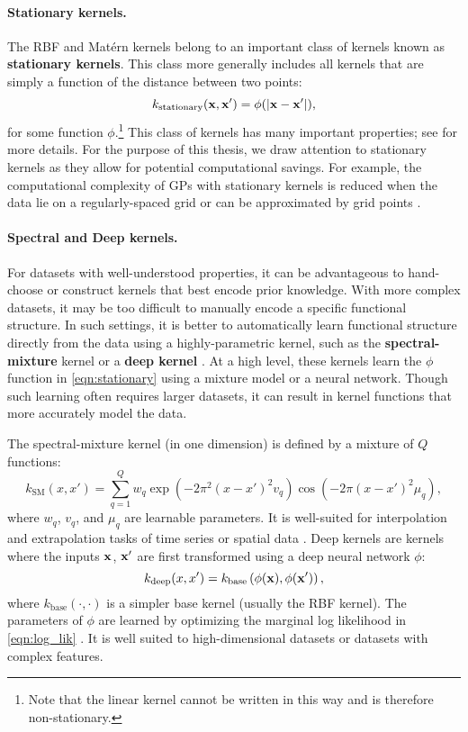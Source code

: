 \paragraph{Stationary kernels.}
The RBF and Mat\'ern kernels belong to an important class of kernels known as {\bf stationary kernels}.
This class more generally includes all kernels that are simply a function of the distance between two points:
\begin{equation}
  k_\text{stationary} (\mathbf{x}, \mathbf{x}') = \phi( \vert \mathbf{x} - \mathbf{x}' \vert ),
  \label{eqn:stationary}
\end{equation}
for some function $\phi$.\footnote{
  Note that the linear kernel cannot be written in this way and is therefore non-stationary.
}
This class of kernels has many important properties; see \citep[e.g.][]{rasmussen2006gaussian,wilson2013gaussian} for more details.
For the purpose of this thesis, we draw attention to stationary kernels as they allow for potential computational savings.
For example, the computational complexity of GPs with stationary kernels is reduced when the data lie on a regularly-spaced grid \cite{cunningham2008fast,saatcci2012scalable} or can be approximated by grid points \cite{wilson2014thesis,wilson2015kernel}.


\paragraph{Spectral and Deep kernels.}
For datasets with well-understood properties, it can be advantageous to hand-choose or construct kernels that best encode prior knowledge.
With more complex datasets, it may be too difficult to manually encode a specific functional structure.
In such settings, it is better to automatically learn functional structure directly from the data using a highly-parametric kernel, such as the {\bf spectral-mixture} kernel \cite{wilson2013gaussian} or a {\bf deep kernel} \cite{wilson2016deep}.
At a high level, these kernels learn the $\phi$ function in \cref{eqn:stationary} using a mixture model or a neural network.
Though such learning often requires larger datasets, it can result in kernel functions that more accurately model the data.

The spectral-mixture kernel (in one dimension) is defined by a mixture of $Q$ functions:
%
\[
  k_\text{SM} (x, x') = \sum_{q=1}^Q w_q
    \exp \left( -2 \pi^2 (x - x')^2 v_q \right)
    \cos \left( -2 \pi (x - x')^2 \mu_q \right),
\]
%
where $w_q$, $v_q$, and $\mu_q$ are learnable parameters.
It is well-suited for interpolation and extrapolation tasks of time series or spatial data \cite{wilson2013gaussian}.
Deep kernels \cite{wilson2016deep}  are kernels where the inputs $\mathbf{x}$, $\mathbf{x}'$ are first transformed using a deep neural network $\phi$:
%
\[
  k_\text{deep} (x, x') = k_\text{base} \left( \phi(\mathbf{x}), \phi(\mathbf{x}') \right),
\]
where $k_\text{base}(\cdot, \cdot)$ is a simpler base kernel (usually the RBF kernel).
The parameters of $\phi$ are learned by optimizing the marginal log likelihood in \cref{eqn:log_lik} \cite{wilson2016deep}.
It is well suited to high-dimensional datasets or datasets with complex features.







